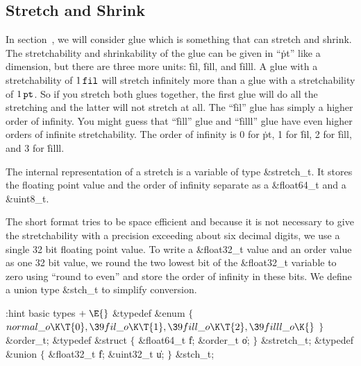 


\subsection{Stretch and Shrink}\label{stretch}
In section~, we will consider glue which
is something that can stretch  and  shrink.
The stretchability and shrinkability of the
glue can be given in ``\.{pt}'' like a dimension,
but there are three more units: \.{fil}, \.{fill}, and \.{filll}.
A glue with a stretchability of $1\,\hbox{\tt fil}$ will stretch infinitely more
than a glue with a stretchability of $1\,\hbox{\tt pt}$. So if you stretch both glues
together, the first glue will do all the stretching and the latter will not stretch
at all. The ``\.{fil}'' glue has simply a higher order of infinity.
You might guess that ``\.{fill}'' glue and ``\.{filll}'' glue have even higher
orders of infinite stretchability.
The order of infinity is 0 for \.{pt}, 1 for \.{fil}, 2 for \.{fill}, and 3 for \.{filll}.

The internal representation of a stretch is a variable of type \&{stretch\_t}.
It stores the floating point value and the order of infinity separate as a \&{float64\_t} and a \&{uint8\_t}.


The short format tries to be space efficient and because it is not necessary to give the
stretchability with a precision exceeding about six decimal digits,
we use a single 32 bit floating point value.
To write a \&{float32\_t} value and an order value as one 32 bit value,
we round the two lowest bit of the \&{float32\_t} variable to zero
using ``round to even'' and store the order of infinity in these bits.
We define a union type \&{stch\_t} to simplify conversion.

\Y\B\4:hint basic types\X${}\mathrel+\E{}$\6
\&{typedef} \&{enum} ${}\{{}$\5
\1${}\index{normal o+\\{normal\_o}}\\{normal\_o}\K\T{0},\39\index{fil o+\\{fil\_o}}\\{fil\_o}\K\T{1},\39\index{fill o+\\{fill\_o}}\\{fill\_o}\K\T{2},\39\index{filll o+\\{filll\_o}}\\{filll\_o}\K{}$\5
\2${}\}{}$ \&{order\_t};\6
\&{typedef} \&{struct} ${}\{{}$\5
\1\&{float64\_t} \|f;\5
\&{order\_t} \|o;\5
\2${}\}{}$ \&{stretch\_t};\6
\&{typedef} \&{union} ${}\{{}$\5
\1\&{float32\_t} \|f;\5
\&{uint32\_t} \|u;\5
\2${}\}{}$ \&{stch\_t};
\Y
\fi

